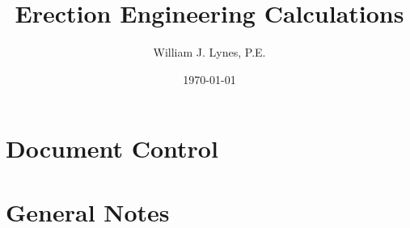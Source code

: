 \documentclass[11pt,letterpaper]{report}
\author{William J. Lynes, P.E.}
\title{Erection Engineering Calculations}
\date{\today}
\begin{document}
% 

\setcounter{page}{1}
\tableofcontents

\newpage

\newcommand\zzz[1]{%
\vspace*{\fill}
{\centering\fontsize{24pt}{24pt}\bfseries#1\par}
\vspace*{\fill}
\clearpage}
\titleformat{\chapter}{\zzz}{\thesection}{1em}{}


\newcommand\yyy[1]{%
\clearpage
\vspace*{\fill}
{\centering\fontsize{18pt}{18pt}\bfseries#1\par}
\vspace*{\fill}
\clearpage}
\titleformat{\section}{\yyy}{\thesection}{1em}{}

\newcommand\aaa[1]{%
\clearpage
\vspace*{\fill}
{\centering\fontsize{14pt}{14pt}\bfseries#1\par}
\vspace*{\fill}
\clearpage}
\titleformat{\subsection}{\aaa}{\thesection}{1em}{}




\chapter*{Document Control}




\setcounter{page}{1}
\renewcommand{\thepage}{\arabic{chapter}-\arabic{page}}
\chapter{General Notes}
% 
\end{document}
